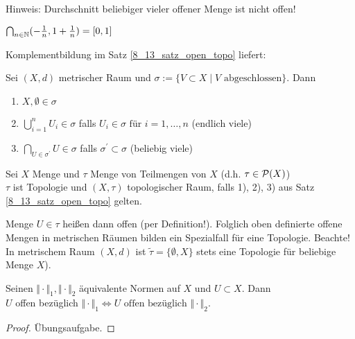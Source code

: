 Hinweis: Durchschnitt beliebiger vieler offener Menge ist nicht offen!

\begin{exmp}
    $\bigcap_{n\in \mathbb{N}} (-\frac{1}{n},1+\frac{1}{n}) = [0,1]$
\end{exmp}

Komplementbildung im Satz \ref{8_13_satz_open_topo} liefert:

\begin{folg}
    Sei $(X,d)$ metrischer Raum und $\sigma :=\{ V \subset   X \mid V \text{ abgeschlossen}\}$. Dann
    \begin{enumerate}[label={\arabic*)}]
    \item $X,\emptyset\in\sigma$
        \item $\bigcup_{i=1}^{n} U_i \in \sigma$ falls $U_i\in \sigma \text{ für } i = 1, \dots, n$ (endlich viele) 
        \item $\bigcap_{U\in\sigma^{\prime}} U \in \sigma$ falls $\sigma^{\prime} \subset \sigma$ (beliebig viele)
    \end{enumerate}
\end{folg}

\begin{mydefn}[Topologie]
    Sei $X$ Menge und $\tau$ Menge von Teilmengen von $X$ (d.h. $\tau \in \mathcal{P}(X)$)\\
    $\tau$ ist Topologie und $(X, \tau)$ topologischer Raum, falls 1), 2), 3) aus Satz \ref{8_13_satz_open_topo} gelten.
\end{mydefn}
\begin{remark}
    Menge $U\in \tau$ heißen dann offen (per Definition!). Folglich oben definierte offene Mengen in metrischen Räumen bilden ein Spezialfall für eine Topologie. Beachte! In metrischem Raum $(X,d)$ ist $\tilde{\tau} = \{\emptyset, X\}$ stets eine Topologie für beliebige Menge $X$).
\end{remark}

\begin{satz}
    Seinen $\Vert \cdot\Vert_1, \Vert \cdot\Vert_2$ äquivalente Normen auf $X$ und $U\subset X$. Dann\\
    $U$ offen bezüglich $\Vert \cdot\Vert_1 \Leftrightarrow U \text{ offen bezüglich } \Vert \cdot\Vert_2$.
\end{satz}

\begin{proof}
    Übungsaufgabe.\QEDA
\end{proof}

